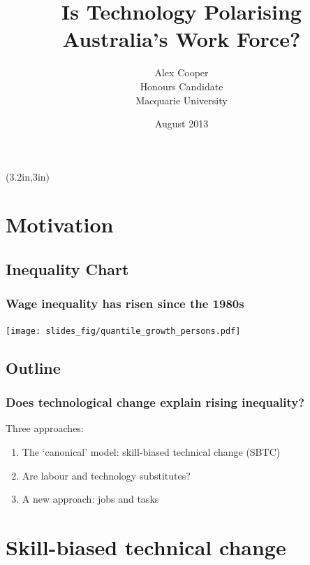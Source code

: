 \documentclass[red]{beamer}
\title[Tasks and Polarisation]{Is Technology Polarising Australia's Work Force?}
\author{Alex Cooper \\ Honours Candidate \\ Macquarie University}
\date{August 2013}
\begin{document}
%
\begin{frame}[plain]
\titlepage
\begin{textblock*}{\textwidth}(3.2in,3in) 
\end{textblock*} 
\end{frame}

\section{Motivation}

\subsection{Inequality Chart}
\begin{frame}[c]
\frametitle{Wage inequality has risen since the 1980s}
\begin{center}
  \texttt{[image: slides\_fig/quantile\_growth\_persons.pdf]}
\end{center}
\end{frame}

\subsection{Outline}
\begin{frame}[c]
\frametitle{Does technological change explain rising inequality?}
Three approaches:
\begin{enumerate}
\vfill\item The `canonical' model: skill-biased technical change (SBTC)
\vfill\item Are labour and technology substitutes?
\vfill\item A new approach: jobs and tasks
\end{enumerate}
\end{frame}

\section{Skill-biased technical change}
\end{document}
